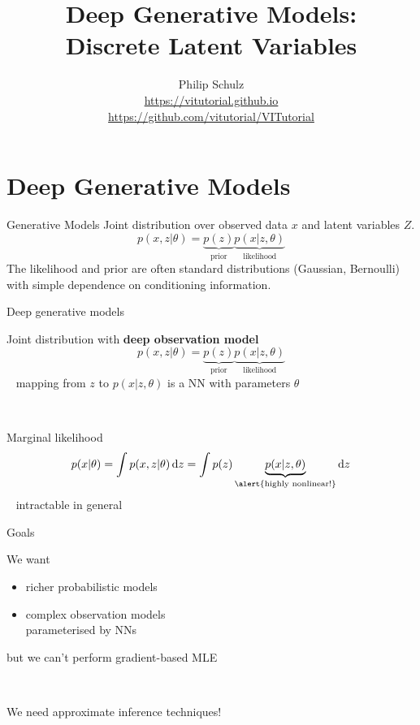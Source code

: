 \documentclass[14pt]{beamer}
\title{Deep Generative Models:\\
Discrete Latent Variables}
\author{Philip Schulz\\
\url{https://vitutorial.github.io} \\
\url{https://github.com/vitutorial/VITutorial}}
\date{}
\begin{document}
\begin{frame}
\maketitle
\end{frame}

\section{Deep Generative Models}
\frame{\tableofcontents[currentsection]}

\begin{frame}{Generative Models}
Joint distribution over observed data $ x $ and latent variables $ Z $.
\begin{equation*}
p(x,z|\theta) =  \underbrace{p(z)}_{\text{prior}} \underbrace{p(x|z,\theta)}_{\text{likelihood}}
\end{equation*} 
The likelihood and prior are often standard distributions (Gaussian, Bernoulli) with simple dependence on conditioning
information.
\end{frame}

\begin{frame}{Deep generative models}

Joint distribution with {\bf deep observation model}
\begin{equation*}
p(x, z|\theta) = \underbrace{p(z)}_{\text{prior}} \underbrace{p(x|z, \theta)}_{\text{likelihood}}
\end{equation*}
~ {\small mapping from $z$ to $p(x|z, \theta)$ is a NN with parameters $\theta$}

~ \pause

Marginal likelihood 
\begin{equation*}
p(x|\theta) = \int p(x, z|\theta) \dd{z} = \int p(z)\underbrace{p(x|z, \theta)}_{\text{\alert{highly nonlinear!}}} \dd{z} 
\end{equation*}
~ \alert{intractable} in general



\end{frame}


\begin{frame}{Goals}

We want
\begin{itemize}
	\item richer probabilistic models  \pause
	\item complex observation models \\
	parameterised by NNs 
\end{itemize}
\pause
but we can't perform gradient-based MLE

~

\pause

We need \alert{approximate inference} techniques!

\end{frame}
\end{document}
